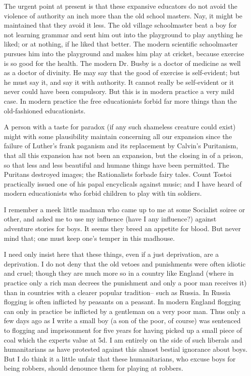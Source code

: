 \documentclass[final,10pt,letterpaper,twocolumn,openany]{book}
\begin{document}
The urgent point at present is that these expansive educators do not
avoid the violence of authority an inch more than the old school masters.
Nay, it might be maintained that they avoid it less. The old village
schoolmaster beat a boy for not learning grammar and sent him out into
the playground to play anything he liked; or at nothing, if he liked that
better. The modern scientific schoolmaster pursues him into the
playground and makes him play at cricket, because exercise is so good for
the health. The modern Dr. Busby is a doctor of medicine as well as a
doctor of divinity. He may say that the good of exercise is self-evident; but
he must say it, and say it with authority. It cannot really be self-evident or
it never could have been compulsory. But this is in modern practice a very
mild case. In modern practice the free educationists forbid far more things
than the old-fashioned educationists.

A person with a taste for paradox (if
any such shameless creature could exist) might with some plausibility
maintain concerning all our expansion since the failure of Luther's frank
paganism and its replacement by Calvin's Puritanism, that all this
expansion has not been an expansion, but the closing in of a prison, so that
less and less beautiful and humane things have been permitted. The
Puritans destroyed images; the Rationalists forbade fairy tales. Count
Tostoi practically issued one of his papal encyclicals against music; and I
have heard of modern educationists who forbid children to play with tin
soldiers. 

I remember a meek little madman who came up to me at some
Socialist soiree or other, and asked me to use my influence (have I any
influence?) against adventure stories for boys. It seems they breed an
appetite for blood. But never mind that; one must keep one's temper in this
madhouse. 

I need only insist here that these things, even if a just
deprivation, are a deprivation. I do not deny that the old vetoes and
punishments were often idiotic and cruel; though they are much more so in
a country like England (where in practice only a rich man decrees the
punishment and only a poor man receives it) than in countries with a
clearer popular tradition-- such as Russia. In Russia flogging is often
inflicted by peasants on a peasant. In modern England flogging can only in
practice be inflicted by a gentleman on a very poor man. Thus only a few
days ago as I write a small boy (a son of the poor, of course) was
sentenced to flogging and imprisonment for five years for having picked
up a small piece of coal which the experts value at 5d. I am entirely on the
side of such liberals and humanitarians as have protested against this
almost bestial ignorance about boys. But I do think it a little unfair that
these humanitarians, who excuse boys for being robbers, should denounce
them for playing at robbers. 
\end{document}
